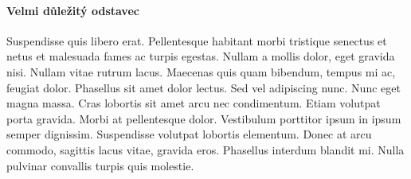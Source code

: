\documentclass[10pt,a4paper]{article}
\begin{document}
		\paragraph{Velmi důležitý odstavec}
	Suspendisse quis libero erat. Pellentesque habitant morbi tristique senectus et netus et malesuada fames ac turpis egestas. Nullam a mollis dolor, eget gravida nisi. Nullam vitae rutrum lacus. Maecenas quis quam bibendum, tempus mi ac, feugiat dolor. Phasellus sit amet dolor lectus. Sed vel adipiscing nunc. Nunc eget magna massa. Cras lobortis sit amet arcu nec condimentum. Etiam volutpat porta gravida. Morbi at pellentesque dolor. Vestibulum porttitor ipsum in ipsum semper dignissim. Suspendisse volutpat lobortis elementum. Donec at arcu commodo, sagittis lacus vitae, gravida eros. Phasellus interdum blandit mi. Nulla pulvinar convallis turpis quis molestie.\\
\end{document}

